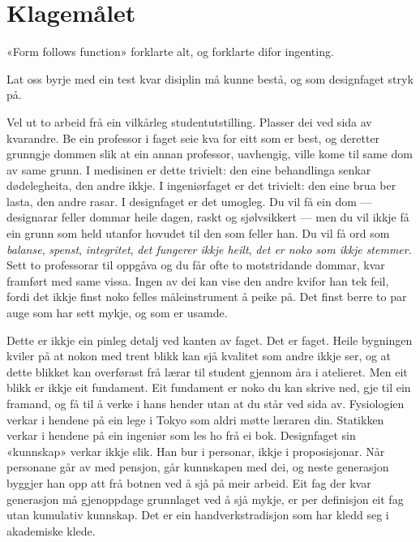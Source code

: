 \chapter{Klagemålet}

\begin{motto}
«Form follows function» forklarte alt, og forklarte difor ingenting.
\end{motto}

Lat oss byrje med ein test kvar disiplin må kunne bestå, og som designfaget stryk på.

Vel ut to arbeid frå ein vilkårleg studentutstilling. Plasser dei ved sida av kvarandre. Be ein professor i faget seie kva for eitt som er best, og deretter grunngje dommen slik at ein annan professor, uavhengig, ville kome til same dom av same grunn. I medisinen er dette trivielt: den eine behandlinga senkar dødelegheita, den andre ikkje. I ingeniørfaget er det trivielt: den eine brua ber lasta, den andre rasar. I designfaget er det umogleg. Du vil få ein dom — designarar feller dommar heile dagen, raskt og sjølvsikkert — men du vil ikkje få ein grunn som held utanfor hovudet til den som feller han. Du vil få ord som \emph{balanse}, \emph{spenst}, \emph{integritet}, \emph{det fungerer ikkje heilt}, \emph{det er noko som ikkje stemmer}. Sett to professorar til oppgåva og du får ofte to motstridande dommar, kvar framført med same vissa. Ingen av dei kan vise den andre kvifor han tek feil, fordi det ikkje finst noko felles måleinstrument å peike på. Det finst berre to par auge som har sett mykje, og som er usamde.

Dette er ikkje ein pinleg detalj ved kanten av faget. Det er faget. Heile bygningen kviler på at nokon med trent blikk kan sjå kvalitet som andre ikkje ser, og at dette blikket kan overførast frå lærar til student gjennom åra i atelieret. Men eit blikk er ikkje eit fundament. Eit fundament er noko du kan skrive ned, gje til ein framand, og få til å verke i hans hender utan at du står ved sida av. Fysiologien verkar i hendene på ein lege i Tokyo som aldri møtte læraren din. Statikken verkar i hendene på ein ingeniør som les ho frå ei bok. Designfaget sin «kunnskap» verkar ikkje slik. Han bur i personar, ikkje i proposisjonar. Når personane går av med pensjon, går kunnskapen med dei, og neste generasjon byggjer han opp att frå botnen ved å sjå på meir arbeid. Eit fag der kvar generasjon må gjenoppdage grunnlaget ved å sjå mykje, er per definisjon eit fag utan kumulativ kunnskap. Det er ein handverkstradisjon som har kledd seg i akademiske klede.

